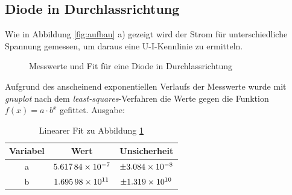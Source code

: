 \subsection{Diode in Durchlassrichtung}
Wie in Abbildung \ref{fig:aufbau} a) gezeigt wird der Strom für unterschiedliche Spannung gemessen, um daraus eine U-I-Kennlinie zu ermitteln.

\begin{figure}[H]
\centering

\caption{Messwerte und Fit für eine Diode in Durchlassrichtung}
\label{fig:diode}
\end{figure}
Aufgrund des anscheinend exponentiellen Verlaufs der Messwerte wurde mit \emph{gnuplot} nach dem \emph{least-squares}-Verfahren die Werte gegen die Funktion $f(x)=a\cdot b^x$ gefittet. Ausgabe:
\begin{table}[H]
  \centering
  \begin{tabular}{c | c | c }
    Variabel   & Wert & Unsicherheit\\ \hline
    a & $\num{5.61784d-7}$ & $\pm\num{3.084d-8}$ \\
    b & $\num{1.69598d+11}$ & $\pm\num{1.319d+10}$
  \end{tabular}
  \caption{Linearer Fit zu Abbildung \ref{fig:diode}}
  \label{tab:fitdiode}
\end{table}
